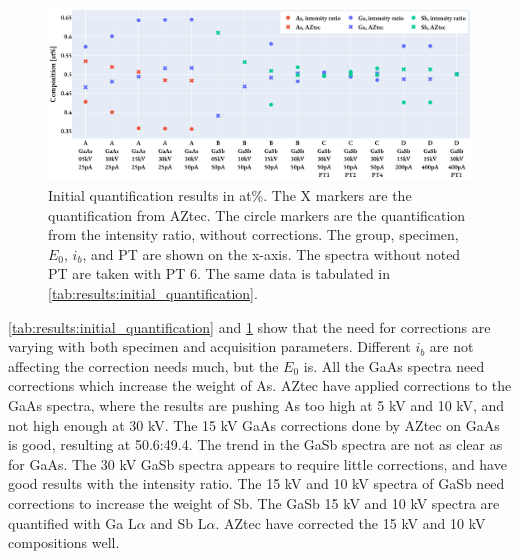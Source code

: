 \begin{figure}[htbp]
    \centering
    \includegraphics[width=0.99\linewidth]{figures/results/initial_quantification.pdf}
    \caption{
        Initial quantification results in at\%.
        The X markers are the quantification from AZtec.
        The circle markers are the quantification from the intensity ratio, without corrections.
        The group, specimen, $E_0$, $i_b$, and PT are shown on the x-axis.
        The spectra without noted PT are taken with PT 6.
        The same data is tabulated in \cref{tab:results:initial_quantification}.
    }
    \label{fig:results:initial_quantification}
\end{figure}



\cref{tab:results:initial_quantification} and \cref{fig:results:initial_quantification} show that the need for corrections are varying with both specimen and acquisition parameters.
Different $i_b$ are not affecting the correction needs much, but the $E_0$ is.
All the GaAs spectra need corrections which increase the weight of As.
AZtec have applied corrections to the GaAs spectra, where the results are pushing As too high at 5 kV and 10 kV, and not high enough at 30 kV.
The 15 kV GaAs corrections done by AZtec on GaAs is good, resulting at 50.6:49.4.
The trend in the GaSb spectra are not as clear as for GaAs.
The 30 kV GaSb spectra appears to require little corrections, and have good results with the intensity ratio.
The 15 kV and 10 kV spectra of GaSb need corrections to increase the weight of Sb.
The GaSb 15 kV and 10 kV spectra are quantified with Ga L$\alpha$ and Sb L$\alpha$.
AZtec have corrected the 15 kV and 10 kV compositions well.


